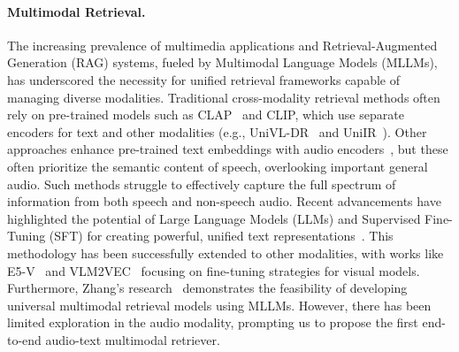 \paragraph{Multimodal Retrieval.}
The increasing prevalence of multimedia applications and Retrieval-Augmented Generation (RAG) systems, fueled by Multimodal Language Models (MLLMs), has underscored the necessity for unified retrieval frameworks capable of managing diverse modalities. Traditional cross-modality retrieval methods often rely on pre-trained models such as CLAP~\cite{elizalde2022claplearningaudioconcepts} and CLIP, which use separate encoders for text and other modalities (e.g., UniVL-DR~\cite{liu2023universalvisionlanguagedenseretrieval} and UniIR~\cite{wei2023uniirtrainingbenchmarkinguniversal}). Other approaches enhance pre-trained text embeddings with audio encoders~\cite{min2025speechretrievalaugmentedgenerationautomatic}, but these often prioritize the semantic content of speech, overlooking important general audio. Such methods struggle to effectively capture the full spectrum of information from both speech and non-speech audio.
Recent advancements have highlighted the potential of Large Language Models (LLMs) and Supervised Fine-Tuning (SFT) for creating powerful, unified text representations~\cite{behnamghader2024llm2veclargelanguagemodels,lee2025nvembedimprovedtechniquestraining}. This methodology has been successfully extended to other modalities, with works like E5-V~\cite{jiang2024e5vuniversalembeddingsmultimodal} and VLM2VEC~\cite{jiang2025vlm2vectrainingvisionlanguagemodels} focusing on fine-tuning strategies for visual models. Furthermore, Zhang's research~\cite{zhang2024gmeimprovinguniversalmultimodal} demonstrates the feasibility of developing universal multimodal retrieval models using MLLMs. However, there has been limited exploration in the audio modality, prompting us to propose the first end-to-end audio-text multimodal retriever.

